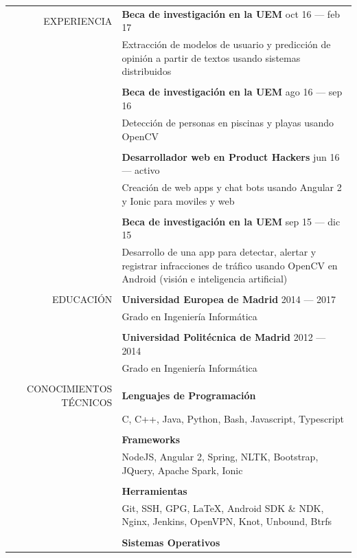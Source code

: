 \documentclass[a4paper, 11pt]{article}
\begin{document}
    \begin{longtable}{rp{11cm}}
        EXPERIENCIA
        & {\bf Beca de investigación en la UEM} \hfill oct 16 --- feb 17\\
        & Extracción de modelos de usuario y predicción de opinión a partir de textos usando sistemas distribuidos\\\\
        & {\bf Beca de investigación en la UEM} \hfill ago 16 --- sep 16\\
        & Detección de personas en piscinas y playas usando OpenCV\\\\
        & {\bf Desarrollador web en Product Hackers} \hfill jun 16 --- activo\\
        & Creación de web apps y chat bots usando Angular 2 y Ionic para moviles y web\\\\
        & {\bf Beca de investigación en la UEM} \hfill sep 15 --- dic 15\\
        & Desarrollo de una app para detectar, alertar y registrar infracciones de tráfico usando OpenCV en Android (visión e inteligencia artificial)\\
        \\
        EDUCACIÓN
        & {\bf Universidad Europea de Madrid} \hfill 2014 --- 2017\\
        & Grado en Ingeniería Informática\\\\
        & {\bf Universidad Politécnica de Madrid} \hfill 2012 --- 2014\\
        & Grado en Ingeniería Informática\\\\
        CONOCIMIENTOS TÉCNICOS
        & {\bf Lenguajes de Programación}\\
        & C, C++, Java, Python, Bash, Javascript, Typescript\\\\
        & {\bf Frameworks}\\
        & NodeJS, Angular 2, Spring, NLTK, Bootstrap, JQuery, Apache Spark, Ionic\\\\
        & {\bf Herramientas}\\
        & Git, SSH, GPG, \LaTeX, Android SDK \& NDK, Nginx, Jenkins, OpenVPN, Knot, Unbound, Btrfs\\\\
        & {\bf Sistemas Operativos}\\

\end{longtable}
\end{document}
